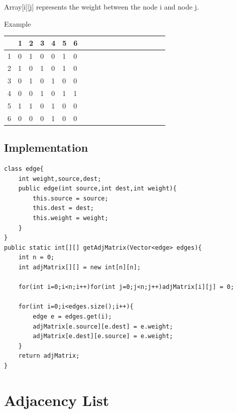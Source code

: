 \documentclass[11pt,oneside]{book}
\begin{document}
Array[i][j] represents the weight between the node i and node j.

Example

\vspace{10px}\begin{tabulary}{0.4\linewidth}{|l|l|l|l|l|l|l|l|l|l|l|l|l|l|l|l|l|l|l}\hline


   &
  1 &
  2 &
  3 &
  4 &
  5 &
  6\\
\hline


  1 &
  0 &
  1 &
  0 &
  0 &
  1 &
  0\\

  2 &
  1 &
  0 &
  1 &
  0 &
  1 &
  0\\

  3 &
  0 &
  1 &
  0 &
  1 &
  0 &
  0\\

  4 &
  0 &
  0 &
  1 &
  0 &
  1 &
  1\\

  5 &
  1 &
  1 &
  0 &
  1 &
  0 &
  0\\

  6 &
  0 &
  0 &
  0 &
  1 &
  0 &
  0\\

\hline\end{tabulary}

\subsection{Implementation}

\begin{lstlisting}
class edge{
    int weight,source,dest;
    public edge(int source,int dest,int weight){
        this.source = source;
        this.dest = dest;
        this.weight = weight;
    }
}
public static int[][] getAdjMatrix(Vector<edge> edges){
    int n = 0;
    int adjMatrix[][] = new int[n][n];
    
    for(int i=0;i<n;i++)for(int j=0;j<n;j++)adjMatrix[i][j] = 0;
    
    for(int i=0;i<edges.size();i++){
        edge e = edges.get(i);
        adjMatrix[e.source][e.dest] = e.weight;
        adjMatrix[e.dest][e.source] = e.weight;
    }
    return adjMatrix;
}
\end{lstlisting}

        \section{ Adjacency List }
        
\end{document}
